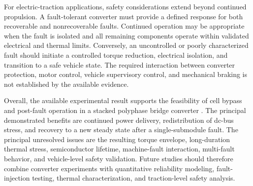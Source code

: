 For electric-traction applications, safety considerations extend beyond continued propulsion. A fault-tolerant converter must provide a defined response for both recoverable and nonrecoverable faults. Continued operation may be appropriate when the fault is isolated and all remaining components operate within validated electrical and thermal limits. Conversely, an uncontrolled or poorly characterized fault should initiate a controlled torque reduction, electrical isolation, and transition to a safe vehicle state. The required interaction between converter protection, motor control, vehicle supervisory control, and mechanical braking is not established by the available evidence. %

Overall, the available experimental result supports the feasibility of cell bypass and post-fault operation in a stacked polyphase bridge converter \cite{Jin2017}. The principal demonstrated benefits are continued power delivery, redistribution of dc-bus stress, and recovery to a new steady state after a single-submodule fault. The principal unresolved issues are the resulting torque envelope, long-duration thermal stress, semiconductor lifetime, machine-fault interaction, multi-fault behavior, and vehicle-level safety validation. Future studies should therefore combine converter experiments with quantitative reliability modeling, fault-injection testing, thermal characterization, and traction-level safety analysis.